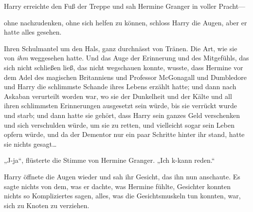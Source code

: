 Harry erreichte den Fuß der Treppe und sah Hermine Granger in voller Pracht—

ohne nachzudenken, ohne sich helfen zu können, schloss Harry die Augen, aber er hatte alles gesehen.



Ihren Schulmantel um den Hals, ganz durchnässt von Tränen. Die Art, wie sie von \emph{ihm} weggesehen hatte. Und das Auge der Erinnerung und des Mitgefühls, das sich nicht schließen ließ, das nicht wegschauen konnte, wusste, dass Hermine vor dem Adel des magischen Britanniens und Professor McGonagall und Dumbledore und Harry die schlimmste Schande ihres Lebens erzählt hatte; und dann nach Askaban verurteilt worden war, wo sie der Dunkelheit und der Kälte und all ihren schlimmsten Erinnerungen ausgesetzt sein würde, bis sie verrückt wurde und starb; und dann hatte sie gehört, dass Harry sein ganzes Geld verschenken und sich verschulden würde, um sie zu retten, und vielleicht sogar sein Leben opfern würde, und da der Dementor nur ein paar Schritte hinter ihr stand, hatte sie nichts gesagt…

„J-ja“, flüsterte die Stimme von Hermine Granger. „Ich k-kann reden.“

Harry öffnete die Augen wieder und sah ihr Gesicht, das ihn nun anschaute. Es sagte nichts von dem, was er dachte, was Hermine fühlte, Gesichter konnten nichts so Kompliziertes sagen, alles, was die Gesichtsmuskeln tun konnten, war, sich zu Knoten zu verziehen.

